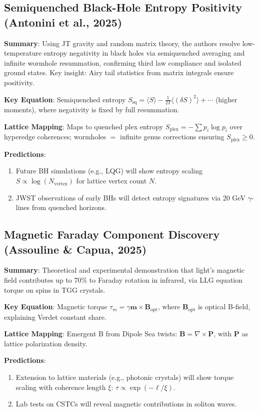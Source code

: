 \documentclass[11pt,a4paper]{article}
\begin{document}
\subsection{Semiquenched Black-Hole Entropy Positivity (Antonini et al., 2025)}

\textbf{Summary}: Using JT gravity and random matrix theory, the authors resolve low-temperature entropy negativity in black holes via semiquenched averaging and infinite wormhole resummation, confirming third law compliance and isolated ground states. Key insight: Airy tail statistics from matrix integrals ensure positivity.

\textbf{Key Equation}: Semiquenched entropy $S_{\mathrm{sq}} = \langle S \rangle - \frac{1}{2T} \langle (\delta S)^2 \rangle + \cdots$ (higher moments), where negativity is fixed by full resummation.

\textbf{Lattice Mapping}: Maps to quenched plex entropy $S_{\mathrm{plex}} = -\sum p_i \log p_i$ over hyperedge coherences; wormholes $=$ infinite genus corrections ensuring $S_{\mathrm{plex}} \geq 0$.

\textbf{Predictions}:
\begin{enumerate}
\item Future BH simulations (e.g., LQG) will show entropy scaling $S \propto \log(N_{\mathrm{vertex}})$ for lattice vertex count $N$.
\item JWST observations of early BHs will detect entropy signatures via 20 GeV $\gamma$-lines from quenched horizons.
\end{enumerate}

\subsection{Magnetic Faraday Component Discovery (Assouline \& Capua, 2025)}

\textbf{Summary}: Theoretical and experimental demonstration that light's magnetic field contributes up to 70\% to Faraday rotation in infrared, via LLG equation torque on spins in TGG crystals.

\textbf{Key Equation}: Magnetic torque $\tau_m = \gamma \mathbf{m} \times \mathbf{B}_{\mathrm{opt}}$, where $\mathbf{B}_{\mathrm{opt}}$ is optical B-field, explaining Verdet constant share.

\textbf{Lattice Mapping}: Emergent B from Dipole Sea twists: $\mathbf{B} = \nabla \times \mathbf{P}$, with $\mathbf{P}$ as lattice polarization density.

\textbf{Predictions}:
\begin{enumerate}
\item Extension to lattice materials (e.g., photonic crystals) will show torque scaling with coherence length $\xi$: $\tau \propto \exp(-\ell / \xi)$.
\item Lab tests on CSTCs will reveal magnetic contributions in soliton waves.
\end{enumerate}
\end{document}
